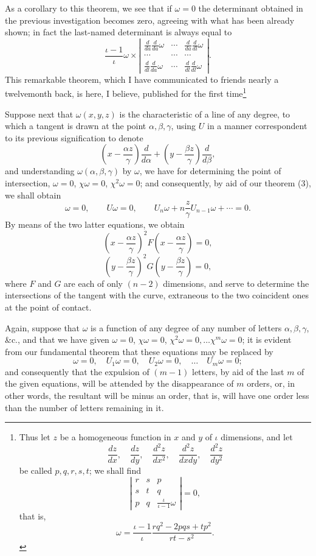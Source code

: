 \documentclass[11pt]{article}
\newcommand{\sourcepage}[1]{\marginpar{\scriptsize p.~#1}}
\begin{document}
{{\sourcepage{174}
As a corollary to this theorem, we see that if $\omega=0$ the determinant obtained in the previous investigation becomes zero, agreeing with what has been already shown; in fact the last-named determinant is always equal to
\[
 \frac{\iota-1}{\iota}\omega\times
\left|
\begin{array}{ccc}
\frac{d}{da}\frac{d}{da}\omega&\cdots&\frac{d}{da}\frac{d}{dl}\omega\\
\cdots&\cdots&\cdots\\
\frac{d}{dl}\frac{d}{da}\omega&\cdots&\frac{d}{dl}\frac{d}{dl}\omega
\end{array}
\right|.
\]
This remarkable theorem, which I have communicated to friends nearly a twelvemonth back, is here, I believe, published for the first time\footnote{Thus let $z$ be a homogeneous function in $x$ and $y$ of $\iota$ dimensions, and let
\[
\frac{dz}{dx},\quad \frac{dz}{dy},\quad \frac{d^2z}{dx^2},\quad \frac{d^2z}{dxdy},\quad \frac{d^2z}{dy^2}
\]
be called $p,q,r,s,t$; we shall find
\[
\left|\begin{array}{ccc}r&s&p\\s&t&q\\p&q&\frac{\iota}{\iota-1}\omega\end{array}\right|=0,
\]
that is,
\[
 \omega=\frac{\iota-1}{\iota}\frac{rq^2-2pqs+tp^2}{rt-s^2}.
\]}

Suppose next that $\omega(x,y,z)$ is the characteristic of a line of any degree, to which a tangent is drawn at the point $\alpha,\beta,\gamma$, using $U$ in a manner correspondent to its previous signification to denote
\[
 \left(x-\frac{\alpha z}{\gamma}\right)\frac{d}{d\alpha}
 +\left(y-\frac{\beta z}{\gamma}\right)\frac{d}{d\beta},
\]
and understanding $\omega(\alpha,\beta,\gamma)$ by $\omega$, we have for determining the point of intersection, $\omega=0$, $\chi\omega=0$, $\chi^2\omega=0$; and consequently, by aid of our theorem (3), we shall obtain
\[
 \omega=0,
 \qquad
 U\omega=0,
 \qquad
 U_n\omega+n\frac{z}{\gamma}U_{n-1}\omega+\cdots=0.
\]
By means of the two latter equations, we obtain
\[
 \left(x-\frac{\alpha z}{\gamma}\right)^2F\left(x-\frac{\alpha z}{\gamma}\right)=0,
\]
\[
 \left(y-\frac{\beta z}{\gamma}\right)^2G\left(y-\frac{\beta z}{\gamma}\right)=0,
\]
\sourcepage{175}
where $F$ and $G$ are each of only $(n-2)$ dimensions, and serve to determine the intersections of the tangent with the curve, extraneous to the two coincident ones at the point of contact.

Again, suppose that $\omega$ is a function of any degree of any number of letters $\alpha,\beta,\gamma$, \&c., and that we have given $\omega=0$, $\chi\omega=0$, $\chi^2\omega=0,\ldots\chi^m\omega=0$; it is evident from our fundamental theorem that these equations may be replaced by
\[
 \omega=0,
 \quad
 U_1\omega=0,
 \quad
 U_2\omega=0,
 \quad\ldots\quad
 U_m\omega=0;
\]
and consequently that the expulsion of $(m-1)$ letters, by aid of the last $m$ of the given equations, will be attended by the disappearance of $m$ orders, or, in other words, the resultant will be minus an order, that is, will have one order less than the number of letters remaining in it.

}}
\end{document}
